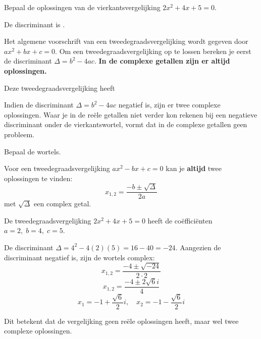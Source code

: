 \documentclass{ximera}
\begin{document}
\begin{exercise}
    Bepaal de oplossingen van de vierkantsvergelijking \(2x^2 + 4x + 5 = 0\).  
    
    \begin{question}
    De discriminant is \choicenegatief.
    
    \begin{feedback}
    Het algemene voorschrift van een tweedegraadsvergelijking wordt gegeven door \(ax^2 + bx + c = 0\).
    Om een tweedegraadsvergelijking op te lossen bereken je eerst de discriminant \(\Delta = b^2 - 4ac\).
    \textbf{In de complexe getallen zijn er altijd oplossingen.}
    \end{feedback}
    \end{question}
    
    \begin{question}
    Deze tweedegraadsvergelijking heeft \choicetweec 
    
    \begin{feedback}
    Indien de discriminant \(\Delta = b^2 - 4ac\) negatief is, zijn er twee complexe oplossingen. Waar je in de reële getallen niet verder kon rekenen bij een negatieve discriminant onder de vierkantswortel, vormt dat in de complexe getallen geen probleem. 
    \end{feedback}
    \end{question}
    
    \begin{question}
    Bepaal de wortels.
    
    \begin{hint}
    Voor een tweedegraadsvergelijking \(ax^2 - bx + c = 0\) kan je \textbf{altijd} twee oplossingen te vinden: 
    \[ x_{1,2} = \frac{-b \pm \sqrt{\Delta}}{2a} \]
    met \(\sqrt{\Delta}\) een complex getal.
    \end{hint}
    \end{question}
    
    \begin{oplossing}
    De tweedegraadsvergelijking \(2x^2 + 4x + 5 = 0\) heeft de coëfficiënten \(a = 2, \; b = 4, \; c = 5\).
    
    De discriminant \( \Delta = 4^2 - 4(2)(5) = 16 - 40 = -24 \).
    Aangezien de discriminant negatief is, zijn de wortels complex:
    \[ x_{1,2} = \frac{-4 \pm \sqrt{-24}}{2\cdot2} \]
    \[ x_{1,2} = \frac{-4 \pm 2\sqrt{6}i}{4} \]
    \[ x_{1} = -1 + \frac{\sqrt{6}}{2}i, \quad x_{2} = -1 - \frac{\sqrt{6}}{2}i \]
    
    Dit betekent dat de vergelijking geen reële oplossingen heeft, maar wel twee complexe oplossingen.
    \end{oplossing}
        
\end{exercise}
\end{document}
